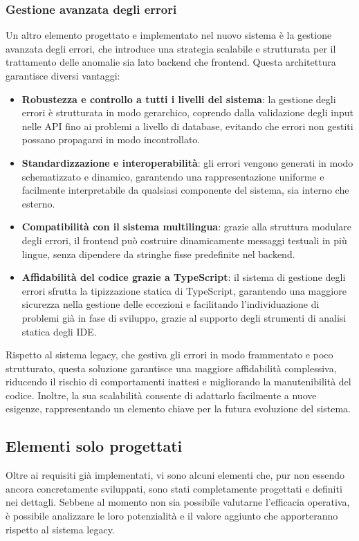 \subsubsection{Gestione avanzata degli errori}
Un altro elemento progettato e implementato nel nuovo sistema è la gestione avanzata degli errori, che introduce una strategia scalabile e strutturata per il trattamento delle anomalie sia lato backend che frontend.
%
Questa architettura garantisce diversi vantaggi:
\begin{itemize}
  \item \textbf{Robustezza e controllo a tutti i livelli del sistema}: la gestione degli errori è strutturata in modo gerarchico, coprendo dalla validazione degli input nelle API fino ai problemi a livello di database, evitando che errori non gestiti possano propagarsi in modo incontrollato.
  \item \textbf{Standardizzazione e interoperabilità}: gli errori vengono generati in modo schematizzato e dinamico, garantendo una rappresentazione uniforme e facilmente interpretabile da qualsiasi componente del sistema, sia interno che esterno.
  \item \textbf{Compatibilità con il sistema multilingua}: grazie alla struttura modulare degli errori, il frontend può costruire dinamicamente messaggi testuali in più lingue, senza dipendere da stringhe fisse predefinite nel backend.
  \item \textbf{Affidabilità del codice grazie a TypeScript}: il sistema di gestione degli errori sfrutta la tipizzazione statica di TypeScript, garantendo una maggiore sicurezza nella gestione delle eccezioni e facilitando l’individuazione di problemi già in fase di sviluppo, grazie al supporto degli strumenti di analisi statica degli IDE.
\end{itemize}

Rispetto al sistema legacy, che gestiva gli errori in modo frammentato e poco strutturato, questa soluzione garantisce una maggiore affidabilità complessiva, riducendo il rischio di comportamenti inattesi e migliorando la manutenibilità del codice. Inoltre, la sua scalabilità consente di adattarlo facilmente a nuove esigenze, rappresentando un elemento chiave per la futura evoluzione del sistema.

\subsection{Elementi solo progettati}
Oltre ai requisiti già implementati, vi sono alcuni elementi che, pur non essendo ancora concretamente sviluppati, sono stati completamente progettati e definiti nei dettagli. Sebbene al momento non sia possibile valutarne l’efficacia operativa, è possibile analizzare le loro potenzialità e il valore aggiunto che apporteranno rispetto al sistema legacy.

